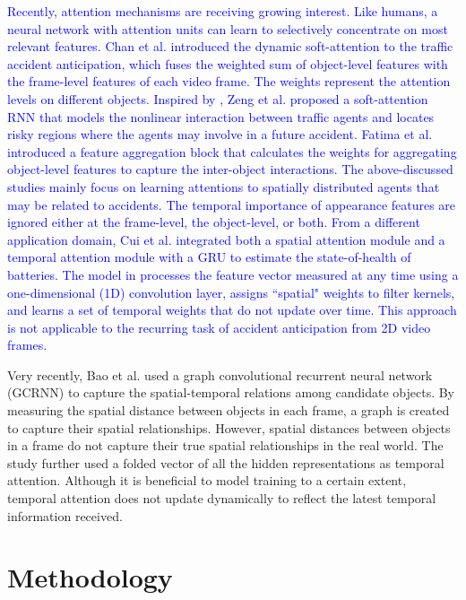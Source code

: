 \documentclass[journal]{IEEEtran}
\begin{document}
\textcolor{blue}{Recently, attention mechanisms are receiving growing interest. Like humans, a neural network with attention units can learn to selectively concentrate on most relevant features. Chan et al. \cite{chan2016anticipating} introduced the dynamic soft-attention to the traffic accident anticipation, which fuses the weighted sum of object-level features with the frame-level features of each video frame. The weights represent the attention levels on different objects.  Inspired by \cite{chan2016anticipating}, Zeng et al. \cite{zeng2017agent} proposed a soft-attention RNN that models the nonlinear interaction between traffic agents and locates risky regions where the agents may involve in a future accident. Fatima et al. \cite{fatima2021global} introduced a feature aggregation block that calculates the weights for aggregating object-level features to capture the inter-object interactions. The above-discussed studies mainly focus on learning attentions to spatially distributed agents that may be related to accidents. The temporal importance of appearance features are ignored either at the frame-level, the object-level, or both. From a different application domain, Cui et al. \cite{cui2021dynamic} integrated both a spatial attention module and a temporal attention module with a GRU \cite{chung2014empirical} to estimate the state-of-health of batteries. The model in \cite{cui2021dynamic} processes the feature vector measured at any time using a one-dimensional (1D) convolution layer, assigns ``spatial" weights to filter kernels, and learns a set of temporal weights that do not update over time. This approach is not applicable to the recurring task of accident anticipation from 2D video frames.}

Very recently, Bao et al. \cite{bao2020uncertainty} used a graph convolutional recurrent neural network (GCRNN) to capture the spatial-temporal relations among candidate objects. By measuring the spatial distance between objects in each frame, a graph is created to capture their spatial relationships. However, spatial distances between objects in a frame do not capture their true spatial relationships in the real world. The study further used a folded vector of all the hidden representations as temporal attention. Although it is beneficial to model training to a certain extent, temporal attention does not update dynamically to reflect the latest temporal information received.


\section{Methodology}
\end{document}
